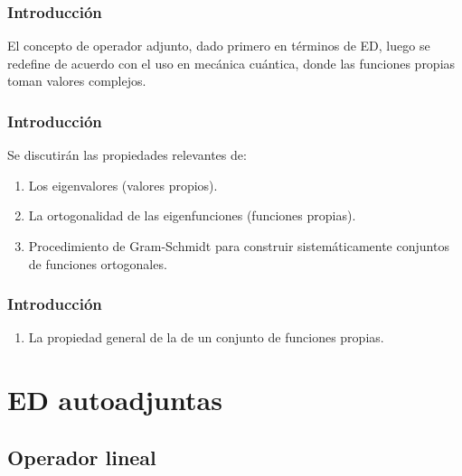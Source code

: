 \begin{frame}
\frametitle{Introducción}
El concepto de operador adjunto, dado primero en términos de ED, luego se redefine de acuerdo con el uso en mecánica cuántica, donde las funciones propias toman valores complejos.
\end{frame}
\begin{frame}
\frametitle{Introducción}
Se discutirán las propiedades relevantes de:
\pause
{}
\begin{enumerate}[<+->]
\item Los eigenvalores (valores propios).
\item La ortogonalidad de las eigenfunciones (funciones propias).
\item Procedimiento de Gram-Schmidt para construir sistemáticamente conjuntos de funciones ortogonales.
\seti
\end{enumerate}
\end{frame}
\begin{frame}
\frametitle{Introducción}
\begin{enumerate}[<+->]
\conti
\item La propiedad general de la  de un conjunto de funciones propias.
\end{enumerate}
\end{frame}

\section{ED autoadjuntas}
\subsection{Operador lineal}

